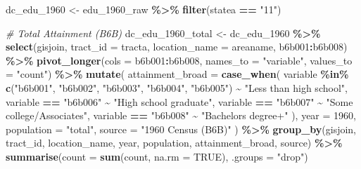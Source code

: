 \documentclass[
]{article}
\newenvironment{Shaded}{\begin{snugshade}}{\end{snugshade}}
\newcommand{\AttributeTok}[1]{\textcolor[rgb]{0.13,0.29,0.53}{#1}}
\newcommand{\CommentTok}[1]{\textcolor[rgb]{0.56,0.35,0.01}{\textit{#1}}}
\newcommand{\ConstantTok}[1]{\textcolor[rgb]{0.56,0.35,0.01}{#1}}
\newcommand{\DecValTok}[1]{\textcolor[rgb]{0.00,0.00,0.81}{#1}}
\newcommand{\FunctionTok}[1]{\textcolor[rgb]{0.13,0.29,0.53}{\textbf{#1}}}
\newcommand{\NormalTok}[1]{#1}
\newcommand{\OtherTok}[1]{\textcolor[rgb]{0.56,0.35,0.01}{#1}}
\newcommand{\SpecialCharTok}[1]{\textcolor[rgb]{0.81,0.36,0.00}{\textbf{#1}}}
\newcommand{\StringTok}[1]{\textcolor[rgb]{0.31,0.60,0.02}{#1}}
\begin{document}
\begin{Shaded}
\begin{Highlighting}[]
\NormalTok{dc\_edu\_1960 }\OtherTok{\textless{}{-}}\NormalTok{ edu\_1960\_raw }\SpecialCharTok{\%\textgreater{}\%} \FunctionTok{filter}\NormalTok{(statea }\SpecialCharTok{==} \StringTok{"11"}\NormalTok{)}

\CommentTok{\# Total Attainment (B6B)}
\NormalTok{dc\_edu\_1960\_total }\OtherTok{\textless{}{-}}\NormalTok{ dc\_edu\_1960 }\SpecialCharTok{\%\textgreater{}\%}
  \FunctionTok{select}\NormalTok{(gisjoin, }\AttributeTok{tract\_id =}\NormalTok{ tracta, }\AttributeTok{location\_name =}\NormalTok{ areaname, b6b001}\SpecialCharTok{:}\NormalTok{b6b008) }\SpecialCharTok{\%\textgreater{}\%}
  \FunctionTok{pivot\_longer}\NormalTok{(}\AttributeTok{cols =}\NormalTok{ b6b001}\SpecialCharTok{:}\NormalTok{b6b008, }\AttributeTok{names\_to =} \StringTok{"variable"}\NormalTok{, }\AttributeTok{values\_to =} \StringTok{"count"}\NormalTok{) }\SpecialCharTok{\%\textgreater{}\%}
  \FunctionTok{mutate}\NormalTok{(}
    \AttributeTok{attainment\_broad =} \FunctionTok{case\_when}\NormalTok{(}
\NormalTok{      variable }\SpecialCharTok{\%in\%} \FunctionTok{c}\NormalTok{(}\StringTok{"b6b001"}\NormalTok{, }\StringTok{"b6b002"}\NormalTok{, }\StringTok{"b6b003"}\NormalTok{, }\StringTok{"b6b004"}\NormalTok{, }\StringTok{"b6b005"}\NormalTok{) }\SpecialCharTok{\textasciitilde{}} \StringTok{"Less than high school"}\NormalTok{,}
\NormalTok{      variable }\SpecialCharTok{==} \StringTok{"b6b006"} \SpecialCharTok{\textasciitilde{}} \StringTok{"High school graduate"}\NormalTok{,}
\NormalTok{      variable }\SpecialCharTok{==} \StringTok{"b6b007"} \SpecialCharTok{\textasciitilde{}} \StringTok{"Some college/Associate\textquotesingle{}s"}\NormalTok{,}
\NormalTok{      variable }\SpecialCharTok{==} \StringTok{"b6b008"} \SpecialCharTok{\textasciitilde{}} \StringTok{"Bachelor\textquotesingle{}s degree+"}
\NormalTok{    ),}
    \AttributeTok{year =} \DecValTok{1960}\NormalTok{, }\AttributeTok{population =} \StringTok{"total"}\NormalTok{, }\AttributeTok{source =} \StringTok{"1960 Census (B6B)"}
\NormalTok{  ) }\SpecialCharTok{\%\textgreater{}\%}
  \FunctionTok{group\_by}\NormalTok{(gisjoin, tract\_id, location\_name, year, population, attainment\_broad, source) }\SpecialCharTok{\%\textgreater{}\%}
  \FunctionTok{summarise}\NormalTok{(}\AttributeTok{count =} \FunctionTok{sum}\NormalTok{(count, }\AttributeTok{na.rm =} \ConstantTok{TRUE}\NormalTok{), }\AttributeTok{.groups =} \StringTok{"drop"}\NormalTok{)}


\end{Highlighting}
\end{Shaded}
\end{document}
